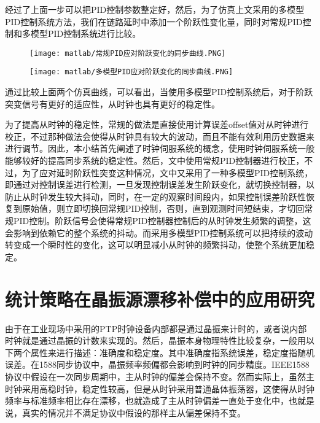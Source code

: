 经过了上面一步可以把PID控制参数整定好，然后，为了仿真上文采用的多模型PID控制系统方法，我们在链路延时中添加一个阶跃性变化量，同时对常规PID控制和多模型PID控制系统进行比较。

\begin{figure}[htbp]
  \centering
  \begin{minipage}[b]{0.7\textwidth}
   \captionstyle{\centering}
   \centering
   \texttt{[image: matlab/常规PID应对阶跃变化的同步曲线.PNG]}
  \end{minipage}     
\end{figure}

\begin{figure}[htbp]
  \centering
  \begin{minipage}[b]{0.7\textwidth}
   \captionstyle{\centering}
   \centering
   \texttt{[image: matlab/多模型PID应对阶跃变化的同步曲线.PNG]}
  \end{minipage}     
\end{figure}

通过比较上面两个仿真曲线，可以看出，当使用多模型PID控制系统后，对于阶跃突变信号有更好的适应性，从时钟也具有更好的稳定性。

为了提高从时钟的稳定性，常规的做法是直接使用计算误差offset值对从时钟进行校正，不过那种做法会使得从时钟具有较大的波动，而且不能有效利用历史数据来进行调节。因此，本小结首先阐述了时钟伺服系统的概念，使用时钟伺服系统一般能够较好的提高同步系统的稳定性。然后，文中使用常规PID控制器进行校正，不过，为了应对延时阶跃性突变这种情况，文中又采用了一种多模型PID控制系统，即通过对控制误差进行检测，一旦发现控制误差发生阶跃变化，就切换控制器，以防止从时钟发生较大抖动，同时，在一定的观察时间段内，如果控制误差阶跃性恢复到原始值，则立即切换回常规PID控制，否则，直到观测时间短结束，才切回常规PID控制。阶跃信号会使得常规PID控制器控制后的从时钟发生频繁的调整，这会影响到依赖它的整个系统的抖动。而采用多模型PID控制系统可以把持续的波动转变成一个瞬时性的变化，这可以明显减小从时钟的频繁抖动，使整个系统更加稳定。

\section{统计策略在晶振源漂移补偿中的应用研究}
由于在工业现场中采用的PTP时钟设备内部都是通过晶振来计时的，或者说内部时钟就是通过晶振的计数来实现的。然后，晶振本身物理特性比较复杂，一般用以下两个属性来进行描述：准确度和稳定度。其中准确度指系统误差，稳定度指随机误差。在1588同步协议中，晶振频率频偏都会影响到时钟的同步精度。IEEE1588协议中假设在一次同步周期中，主从时钟的偏差会保持不变。然而实际上，虽然主时钟采用高稳时钟，稳定性较高，但是从时钟采用普通晶体振荡器，这使得从时钟频率与标准频率相比存在漂移，也就造成了主从时钟偏差一直处于变化中，也就是说，真实的情况并不满足协议中假设的那样主从偏差保持不变。

